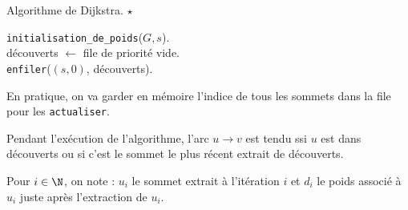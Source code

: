 \documentclass[french, 11pt]{article}
\begin{document}
\begin{defi}{Algorithme de Dijkstra. $\star$}{}
    \hspace*{0.28cm}\begin{algorithm}[H]
        \LinesNumbered
        \caption{Algorithme de Dijkstra.}
        \texttt{initialisation\_de\_poids}($G,s$).\\
        découverts $\gets$ file de priorité vide.\\
        \texttt{enfiler}($(s,0)$, découverts).\\
    \end{algorithm}
    En pratique, on va garder en mémoire l'indice de tous les sommets dans la file pour les \texttt{actualiser}.
\end{defi}

\vspace*{-0.8cm}

\begin{prop}{}{}
    Pendant l'exécution de l'algorithme, l'arc $u\to v$ est tendu ssi $u$ est dans découverts ou si c'est le sommet le plus récent extrait de découverts.
\end{prop}

\vspace*{-0.8cm}

\begin{nota}{}{}
    Pour $i\in\N$, on note : $u_i$ le sommet extrait à l'itération $i$ et $d_i$ le poids associé à $u_i$ juste après l'extraction de $u_i$.
\end{nota}

\vspace*{-0.8cm}
\end{document}
